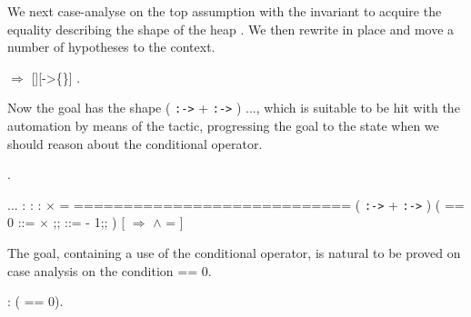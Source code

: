 \coqdocemptyline
We next case-analyse on the top assumption with the invariant
 to acquire the equality describing the shape of the heap
. We then rewrite  in place and move a number of hypotheses to
the context.
\begin{coqdoccode}
\coqdocemptyline
\coqdocnoindent
{}\ensuremath{\Rightarrow} [][->\{\}]  \coqdocvar{\_}.\coqdoceol
\coqdocemptyline
\end{coqdoccode}
Now the goal has the shape  ( \texttt{:->}  +  \texttt{:->} ) ...,
which is suitable to be hit with the automation by means of the
  tactic, progressing the goal to the state when
we should reason about the conditional operator.
\begin{coqdoccode}
\coqdocemptyline
\coqdocnoindent
{}.\coqdoceol
\coqdocemptyline
\end{coqdoccode}
\coqdoceol
\coqdocemptyline
\coqdocindent{1.00em}
...\coqdoceol
\coqdocindent{1.00em}
 : \coqdoceol
\coqdocindent{1.00em}
 : \coqdoceol
\coqdocindent{1.00em}
 :   \ensuremath{\times}  =  \coqdoceol
\coqdocindent{1.00em}
============================\coqdoceol
\coqdocindent{1.50em}
 ( \texttt{:->}  +  \texttt{:->} )\coqdoceol
\coqdocindent{2.50em}
(  == 0      ::=  \ensuremath{\times} ;;  ::=  - 1;;  )\coqdoceol
\coqdocindent{2.50em}
[   \ensuremath{\Rightarrow}      \ensuremath{\land}  =  ]

\coqdocemptyline
The goal, containing a use of the conditional operator, is natural to
be proved on case analysis on the condition  == 0.
\begin{coqdoccode}
\coqdocemptyline
\coqdocnoindent
{} : ( == 0).\coqdoceol
\coqdocemptyline
\end{coqdoccode}


